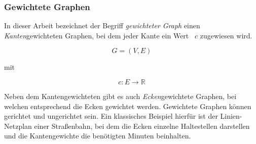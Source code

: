 \subsubsection{Gewichtete Graphen}
In dieser Arbeit bezeichnet der Begriff \textit{gewichteter Graph} einen \textit{Kanten}gewichteten Graphen, bei dem jeder Kante ein Wert ~$c$ zugewiesen wird.

$$G = (V,E)$$ 
\begin{center}
mit
\end{center}
$$c: E \rightarrow \mathbb{R}$$

Neben dem Kantengewichteten gibt es auch \textit{Ecken}gewichtete Graphen, bei welchen entsprechend die Ecken gewichtet werden.
Gewichtete Graphen können gerichtet und ungerichtet sein.
Ein klassisches Beispiel hierfür ist der Linien-Netzplan einer Straßenbahn, bei dem die Ecken einzelne Haltestellen darstellen und die Kantengewichte die benötigten Minuten beinhalten.

